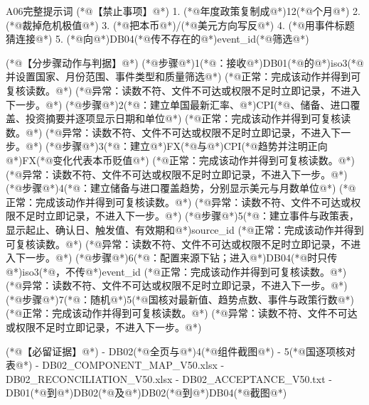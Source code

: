 \documentclass[UTF8,openany,zihao=-4]{ctexbook}
\renewcommand{\_}{\textunderscore\allowbreak}
\begin{document}
\begin{PromptBox}{A06完整提示词}
(*@{\promptcjk 【禁止事项】}@*)
1. (*@{\promptcjk 年度政策复制成}@*)12(*@{\promptcjk 个月}@*)
2. (*@{\promptcjk 裁掉危机极值}@*)
3. (*@{\promptcjk 把本币}@*)/(*@{\promptcjk 美元方向写反}@*)
4. (*@{\promptcjk 用事件标题猜连接}@*)
5. (*@{\promptcjk 向}@*)DB04(*@{\promptcjk 传不存在的}@*)event_id(*@{\promptcjk 筛选}@*)

(*@{\promptcjk 【分步骤动作与判据】}@*)
(*@{\promptcjk 步骤}@*)1(*@{\promptcjk ：接收}@*)DB01(*@{\promptcjk 的}@*)iso3(*@{\promptcjk 并设置国家、月份范围、事件类型和质量筛选}@*)
  (*@{\promptcjk 正常：完成该动作并得到可复核读数。}@*)
  (*@{\promptcjk 异常：读数不符、文件不可达或权限不足时立即记录，不进入下一步。}@*)
(*@{\promptcjk 步骤}@*)2(*@{\promptcjk ：建立单国最新汇率、}@*)CPI(*@{\promptcjk 、储备、进口覆盖、投资摘要并逐项显示日期和单位}@*)
  (*@{\promptcjk 正常：完成该动作并得到可复核读数。}@*)
  (*@{\promptcjk 异常：读数不符、文件不可达或权限不足时立即记录，不进入下一步。}@*)
(*@{\promptcjk 步骤}@*)3(*@{\promptcjk ：建立}@*)FX(*@{\promptcjk 与}@*)CPI(*@{\promptcjk 趋势并注明正向}@*)FX(*@{\promptcjk 变化代表本币贬值}@*)
  (*@{\promptcjk 正常：完成该动作并得到可复核读数。}@*)
  (*@{\promptcjk 异常：读数不符、文件不可达或权限不足时立即记录，不进入下一步。}@*)
(*@{\promptcjk 步骤}@*)4(*@{\promptcjk ：建立储备与进口覆盖趋势，分别显示美元与月数单位}@*)
  (*@{\promptcjk 正常：完成该动作并得到可复核读数。}@*)
  (*@{\promptcjk 异常：读数不符、文件不可达或权限不足时立即记录，不进入下一步。}@*)
(*@{\promptcjk 步骤}@*)5(*@{\promptcjk ：建立事件与政策表，显示起止、确认日、触发值、有效期和}@*)source_id
  (*@{\promptcjk 正常：完成该动作并得到可复核读数。}@*)
  (*@{\promptcjk 异常：读数不符、文件不可达或权限不足时立即记录，不进入下一步。}@*)
(*@{\promptcjk 步骤}@*)6(*@{\promptcjk ：配置来源下钻；进入}@*)DB04(*@{\promptcjk 时只传}@*)iso3(*@{\promptcjk ，不传}@*)event_id
  (*@{\promptcjk 正常：完成该动作并得到可复核读数。}@*)
  (*@{\promptcjk 异常：读数不符、文件不可达或权限不足时立即记录，不进入下一步。}@*)
(*@{\promptcjk 步骤}@*)7(*@{\promptcjk ：随机}@*)5(*@{\promptcjk 国核对最新值、趋势点数、事件与政策行数}@*)
  (*@{\promptcjk 正常：完成该动作并得到可复核读数。}@*)
  (*@{\promptcjk 异常：读数不符、文件不可达或权限不足时立即记录，不进入下一步。}@*)

(*@{\promptcjk 【必留证据】}@*)
- DB02(*@{\promptcjk 全页与}@*)4(*@{\promptcjk 组件截图}@*)
- 5(*@{\promptcjk 国逐项核对表}@*)
- DB02_COMPONENT_MAP_V50.xlsx
- DB02_RECONCILIATION_V50.xlsx
- DB02_ACCEPTANCE_V50.txt
- DB01(*@{\promptcjk 到}@*)DB02(*@{\promptcjk 及}@*)DB02(*@{\promptcjk 到}@*)DB04(*@{\promptcjk 截图}@*)


\end{PromptBox}
\end{document}

